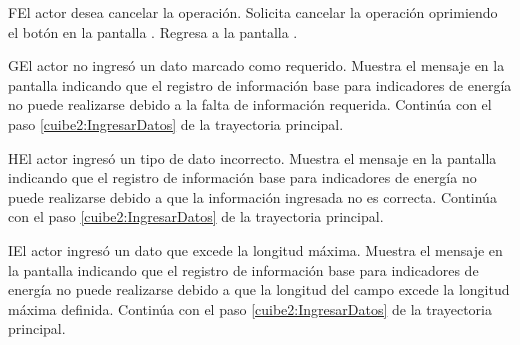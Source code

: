     \begin{UCtrayectoriaA}{F}{El actor desea cancelar la operación.}
    \UCpaso[\UCactor] Solicita cancelar la operación oprimiendo el botón  en la pantalla .
    \UCpaso[] Regresa a la pantalla . 
    \end{UCtrayectoriaA}
  
    \begin{UCtrayectoriaA}{G}{El actor no ingresó un dato marcado como requerido.}    
    \UCpaso[\UCsist] Muestra el mensaje  en la pantalla  indicando que el registro de información base para indicadores de energía no puede realizarse debido a la falta de información requerida.
    \UCpaso[] Continúa con el paso \ref{cuibe2:IngresarDatos} de la trayectoria principal.     
    \end{UCtrayectoriaA}
 
        \begin{UCtrayectoriaA}{H}{El actor ingresó un tipo de dato incorrecto.}    
    \UCpaso[\UCsist] Muestra el mensaje  en la pantalla  indicando que el registro de información base para indicadores de energía no puede realizarse debido a que la información ingresada no es correcta.
    \UCpaso[] Continúa con el paso \ref{cuibe2:IngresarDatos} de la trayectoria principal.     
    \end{UCtrayectoriaA}
    
            \begin{UCtrayectoriaA}{I}{El actor ingresó un dato que excede la longitud máxima.}    
    \UCpaso[\UCsist] Muestra el mensaje  en la pantalla  indicando que el registro de información base para indicadores de energía no puede realizarse debido a que la longitud del campo excede la longitud máxima definida.
    \UCpaso[] Continúa con el paso \ref{cuibe2:IngresarDatos} de la trayectoria principal.     
    \end{UCtrayectoriaA}